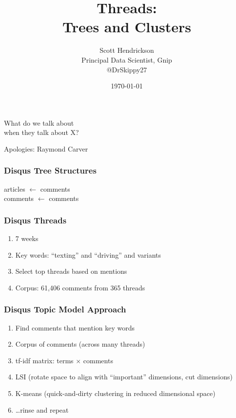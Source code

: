 \documentclass{beamer}
\begin{document}
\title{Threads: \\ Trees and Clusters}
\author{Scott Hendrickson \\ Principal Data Scientist, Gnip \\  @DrSkippy27}
\date{\today} 


\begin{frame}
\titlepage
\end{frame}


\begin{frame}
\begin{center}
{\Huge What do we talk about \\ [15pt] when they talk about X?} 
\end{center}
\hfill Apologies: Raymond Carver \\
\end{frame}

\begin{frame}\frametitle{Disqus Tree Structures}
\begin{center}
{\Huge articles $\leftarrow$ comments \\ [20 pt] comments $\leftarrow$ comments}
\end{center}
\end{frame}

\begin{frame}\frametitle{Disqus Threads}
\begin{center}
{\Large 
\begin{enumerate}
\item 7 weeks
\item Key words: ``texting'' and ``driving'' and variants
\item Select top threads based on mentions
\item Corpus: 61,406 comments from 365 threads
\end{enumerate}
}
\end{center}
\end{frame}

\begin{frame}\frametitle{Disqus Topic Model Approach}
\begin{center}
{\Large 
\begin{enumerate}
\item Find comments that mention key words
\item Corpus of comments (across many threads)
\item tf-idf matrix: terms $\times$ comments
\item LSI (rotate space to align with ``important'' dimensions, cut dimensions)
\item K-means (quick-and-dirty clustering in reduced dimensional space)
\item \ldots rinse and repeat
\end{enumerate}
}
\end{center}
\end{frame}
\end{document}
